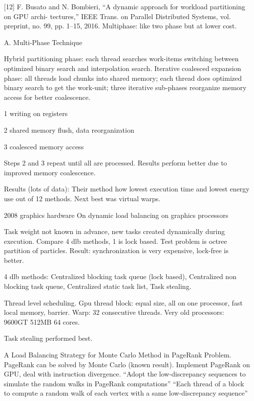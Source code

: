 \documentclass{article}
\begin{document}
[12] F. Busato and N. Bombieri, “A dynamic approach for workload partitioning on GPU archi- tectures,” IEEE Trans. on Parallel Distributed Systems, vol. preprint, no. 99, pp. 1–15, 2016. 
Multiphase: like two phase but at lower cost.

A. Multi-Phase Technique

Hybrid partitioning phase: each thread searches work-items switching between optimized binary search and interpolation search.
Iterative coalesced expansion phase: all threads load chunks into shared memory; each thread does optimized binary search to get the work-unit; three iterative sub-phases reorganize memory access for better coalescence.

1 writing on registers

2 shared memory flush, data reorganization

3 coalesced memory access

Steps 2 and 3 repeat until all are processed.  Results perform better due to improved memory coalescence.

Results (lots of data):
Their method how lowest execution time and lowest energy use out of 12 methods.  Next best was virtual warps.


\cite{Cederman:2008:DLB:1413957.1413967}


2008 graphics hardware
On dynamic load balancing on graphics processors

Task weight not known in advance, new tasks created dynamically during execution.
Compare 4 dlb methods, 1 is lock based.
Test problem is octree partition of particles.
Result: synchronization is very expensive, lock-free is better.

4 dlb methods:
Centralized blocking task queue (lock based),
Centralized non blocking task queue,
Centralized static task list,
Task stealing.

Thread level scheduling.
Gpu thread block: equal size, all on one processor, fast local memory, barrier.
Warp: 32 consecutive threads.
Very old processors: 9600GT 512MB 64 cores.

Task stealing performed best.


\cite{10.1007/978-981-10-6442-5_56}

A Load Balancing Strategy for Monte Carlo Method in PageRank Problem.
PageRank can be solved by Monte Carlo (known result).
Implement PageRank on GPU, deal with instruction divergence.
“Adopt the low-discrepancy sequences to simulate the random walks in PageRank computations”
“Each thread of a block to compute a random walk of each vertex with a same low-discrepancy sequence”
\end{document}
